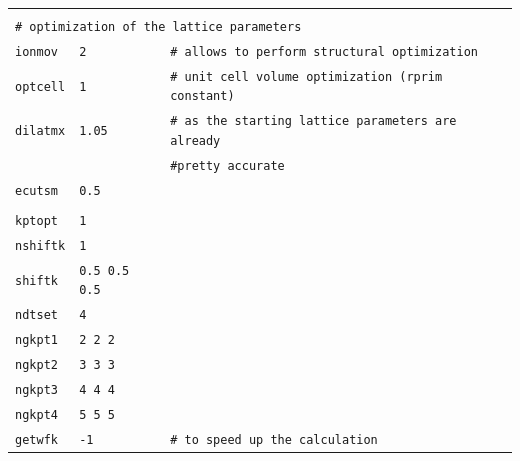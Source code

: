 \documentclass[11pt,a4paper]{article}
\begin{document}
\begin{center}
\begin{tabular}{lll}
&&\\
\multicolumn{3}{l}{\texttt{\# optimization of the lattice parameters}}\\
\texttt{ionmov} & \texttt{2} & \texttt{\# allows to perform structural optimization}\\
\texttt{optcell} & \texttt{1} & \texttt{\# unit cell volume optimization (rprim constant)}\\
\texttt{dilatmx} & \texttt{1.05} & \texttt{\# as the starting lattice parameters are already}\\
&&\texttt{\#\space\space\space\space  pretty accurate}\\
\texttt{ecutsm} & \texttt{0.5} &\\
\\
\texttt{kptopt} & \texttt{1} & \\
\texttt{nshiftk} & \texttt{1} & \\
\texttt{shiftk} & \texttt{0.5 0.5 0.5} &\\
\texttt{ndtset} & \texttt{4} & \\
\texttt{ngkpt1} & \texttt{2 2 2} & \\
\texttt{ngkpt2} & \texttt{3 3 3} & \\
\texttt{ngkpt3} & \texttt{4 4 4} & \\
\texttt{ngkpt4} & \texttt{5 5 5} & \\
\texttt{getwfk} & \texttt{-1} & \texttt{\# to speed up the calculation}\\
\end{tabular}
\end{center} 
\end{document}
